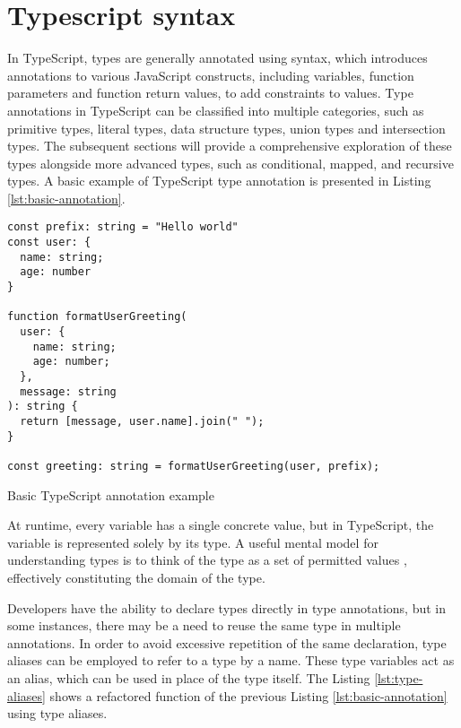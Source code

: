 \section{Typescript syntax}

In TypeScript, types are generally annotated using  syntax, which introduces annotations to various JavaScript constructs, including variables, function parameters and function return values, to add constraints to values. Type annotations in TypeScript can be classified into multiple categories, such as primitive types, literal types, data structure types, union types and intersection types. The subsequent sections will provide a comprehensive exploration of these types alongside more advanced types, such as conditional, mapped, and recursive types. A basic example of TypeScript type annotation is presented in Listing \ref{lst:basic-annotation}.

\begin{listing}[ht]
  \begin{verbatim}
const prefix: string = "Hello world"
const user: {
  name: string;
  age: number
}

function formatUserGreeting(
  user: {
    name: string;
    age: number;
  }, 
  message: string
): string {
  return [message, user.name].join(" ");
}

const greeting: string = formatUserGreeting(user, prefix); 
\end{verbatim}
  \caption{Basic TypeScript annotation example}\label{lst:basic-annotation}
\end{listing}

At runtime, every variable has a single concrete value, but in TypeScript, the variable is represented solely by its type. A useful mental model for understanding types is to think of the type as a set of permitted values \cite{vanderkamEffectiveTypeScript622019}, effectively constituting the domain of the type.

Developers have the ability to declare types directly in type annotations, but in some instances, there may be a need to reuse the same type in multiple annotations. In order to avoid excessive repetition of the same declaration, type aliases can be employed to refer to a type by a name. These type variables act as an alias, which can be used in place of the type itself. The Listing \ref{lst:type-aliases} shows a refactored  function of the previous Listing \ref{lst:basic-annotation} using type aliases.

